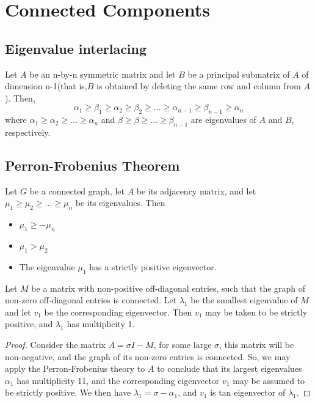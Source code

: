 \section{Connected Components}

\subsection{Eigenvalue interlacing}
\begin{theorem}
Let $A$ be an n-by-n symmetric matrix and let $B$ be a principal submatrix of $A$ of dimension n-1(that is,$B$ is obtained by deleting the same row and column from $A$). Then,
\begin{equation}
    \alpha_1\geq\beta_1\geq \alpha_2\geq \beta_2\geq...\geq \alpha_{n-1}\geq \beta_{n-1}\geq \alpha_n
\end{equation}
where $\alpha_1 \geq \alpha_2\geq ... \geq \alpha_n$ and $\beta \geq \beta\geq ... \geq \beta_{n-1}$ are eigenvalues of $A$ and $B$, respectively.
\end{theorem}

\subsection{Perron-Frobenius Theorem}
\begin{theorem}
    Let $G$ be a connected graph, let $A$ be its adjacency matrix, and let $\mu_1 \geq \mu_2\geq... \geq \mu_n$ be its eigenvalues. Then
    \begin{itemize}
        \item $\mu_1 \geq -\mu_n $
        \item $\mu_1 > \mu_2$
        \item The eigenvalue $\mu_1$ has a strictly positive eigenvector.
    \end{itemize}
\end{theorem}
\begin{corollary}
\label{PFcorollary}
Let $M$ be a matrix with non-positive off-diagonal entries, such that the graph of non-zero off-diagonal entries is connected. Let $\lambda_1$ be the smallest eigenvalue of $M$ and let $v_1$ be the corresponding eigenvector. Then $v_1$ may be taken to be strictly positive, and $\lambda_1$ has multiplicity 1.
\end{corollary}

\begin{proof}
Consider the matrix $A=\sigma I -M$, for some large $\sigma$, this matrix will be non-negative, and the graph of its non-zero entries is connected. So, we may apply the Perron-Frobenius theory to $A$ to conclude that its largest eigenvalues $\alpha_1$ has multiplicity 11, and the corresponding eigenvector $v_1$ may be assumed to be strictly positive. We then have $\lambda_1 =\sigma - \alpha_1$, and $v_1$ is tan eigenvector of $\lambda_1$.
\end{proof}


